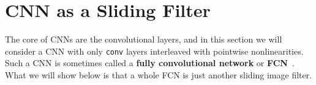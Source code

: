 \section{CNN as a Sliding Filter}






The core of CNNs are the convolutional layers, and in this section we will consider a CNN with only \texttt{conv} layers interleaved with pointwise nonlinearities. Such a CNN is sometimes called a \textbf{fully convolutional network} or \textbf{FCN}~\cite{FCNs}. What we will show below is that a whole FCN is just another sliding image filter.

